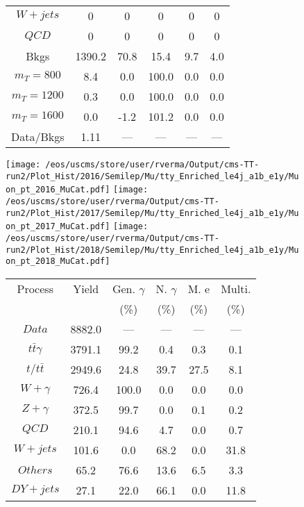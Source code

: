 \begin{figure}
\begin{minipage}[c]{0.32\textwidth}
{\begin{tabular}{cccccc}
$ W+jets $ &  0 &  0 &  0 &  0 &  0\\
$ QCD $ &  0 &  0 &  0 &  0 &  0\\
Bkgs &  1390.2 &  70.8 &  15.4 &  9.7 &  4.0\\
$ m_{T} = 800 $ &  8.4 &  0.0 &  100.0 &  0.0 &  0.0\\
$ m_{T} = 1200 $ &  0.3 &  0.0 &  100.0 &  0.0 &  0.0\\
$ m_{T} = 1600 $ &  0.0 &  -1.2 &  101.2 &  0.0 &  0.0\\
Data/Bkgs &  1.11 &  --- &  --- &  --- &  ---\\
\hline
\end{tabular}
}
\end{minipage}
\end{figure}

\begin{figure}
\centering
\texttt{[image: /eos/uscms/store/user/rverma/Output/cms-TT-run2/Plot\_Hist/2016/Semilep/Mu/tty\_Enriched\_le4j\_a1b\_e1y/Muon\_pt\_2016\_MuCat.pdf]}
\texttt{[image: /eos/uscms/store/user/rverma/Output/cms-TT-run2/Plot\_Hist/2017/Semilep/Mu/tty\_Enriched\_le4j\_a1b\_e1y/Muon\_pt\_2017\_MuCat.pdf]}
\texttt{[image: /eos/uscms/store/user/rverma/Output/cms-TT-run2/Plot\_Hist/2018/Semilep/Mu/tty\_Enriched\_le4j\_a1b\_e1y/Muon\_pt\_2018\_MuCat.pdf]}
\begin{minipage}[c]{0.32\textwidth}
\centering
\tiny{
\begin{tabular}{cccccc}
\hline
Process & Yield & Gen. $\gamma$ & N. $\gamma$ & M. e & Multi. \\
 &  & (\%) & (\%) & (\%) & (\%)  \\
\hline
                                                                      $ Data $ &  8882.0 &  --- &  --- &  --- &  ---\\
$ t\bar{t}\gamma $ &  3791.1 &  99.2 &  0.4 &  0.3 &  0.1\\
$ t/t\bar{t} $ &  2949.6 &  24.8 &  39.7 &  27.5 &  8.1\\
$ W+\gamma $ &  726.4 &  100.0 &  0.0 &  0.0 &  0.0\\
$ Z+\gamma $ &  372.5 &  99.7 &  0.0 &  0.1 &  0.2\\
$ QCD $ &  210.1 &  94.6 &  4.7 &  0.0 &  0.7\\
$ W+jets $ &  101.6 &  0.0 &  68.2 &  0.0 &  31.8\\
$ Others $ &  65.2 &  76.6 &  13.6 &  6.5 &  3.3\\
$ DY+jets $ &  27.1 &  22.0 &  66.1 &  0.0 &  11.8\\

\end{tabular}}
\end{minipage}
\end{figure}
